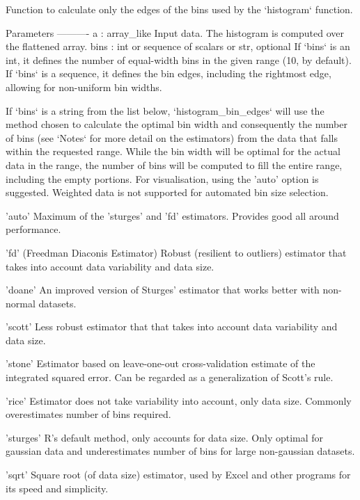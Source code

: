 \begin{DoxyVerb}Function to calculate only the edges of the bins used by the `histogram`
function.

Parameters
----------
a : array_like
    Input data. The histogram is computed over the flattened array.
bins : int or sequence of scalars or str, optional
    If `bins` is an int, it defines the number of equal-width
    bins in the given range (10, by default). If `bins` is a
    sequence, it defines the bin edges, including the rightmost
    edge, allowing for non-uniform bin widths.

    If `bins` is a string from the list below, `histogram_bin_edges` will use
    the method chosen to calculate the optimal bin width and
    consequently the number of bins (see `Notes` for more detail on
    the estimators) from the data that falls within the requested
    range. While the bin width will be optimal for the actual data
    in the range, the number of bins will be computed to fill the
    entire range, including the empty portions. For visualisation,
    using the 'auto' option is suggested. Weighted data is not
    supported for automated bin size selection.

    'auto'
        Maximum of the 'sturges' and 'fd' estimators. Provides good
        all around performance.

    'fd' (Freedman Diaconis Estimator)
        Robust (resilient to outliers) estimator that takes into
        account data variability and data size.

    'doane'
        An improved version of Sturges' estimator that works better
        with non-normal datasets.

    'scott'
        Less robust estimator that that takes into account data
        variability and data size.

    'stone'
        Estimator based on leave-one-out cross-validation estimate of
        the integrated squared error. Can be regarded as a generalization
        of Scott's rule.

    'rice'
        Estimator does not take variability into account, only data
        size. Commonly overestimates number of bins required.

    'sturges'
        R's default method, only accounts for data size. Only
        optimal for gaussian data and underestimates number of bins
        for large non-gaussian datasets.

    'sqrt'
        Square root (of data size) estimator, used by Excel and
        other programs for its speed and simplicity.


\end{DoxyVerb}
